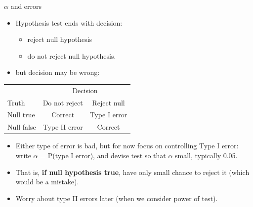 \documentclass[
  ignorenonframetext,
]{beamer}
\providecommand{\tightlist}{%
  \setlength{\itemsep}{0pt}\setlength{\parskip}{0pt}}
\begin{document}
\begin{frame}{\(\alpha\) and errors}
\protect\hypertarget{alpha-and-errors}{}

\begin{itemize}
\tightlist
\item
  Hypothesis test ends with decision:

  \begin{itemize}
  \tightlist
  \item
    reject null hypothesis
  \item
    do not reject null hypothesis.
  \end{itemize}
\item
  but decision may be wrong:
\end{itemize}

\begin{center}
  
  
\begin{tabular}{|l|cc|}
\hline
  & \multicolumn{2}{c|}{Decision}\\
Truth & Do not reject & Reject null\\
\hline
Null true & Correct & Type I error\\
Null false & Type II error & Correct\\
\hline
\end{tabular}
\end{center}

\begin{itemize}
\tightlist
\item
  Either type of error is bad, but for now focus on controlling Type I
  error: write \(\alpha\) = P(type I error), and devise test so that
  \(\alpha\) small, typically 0.05.
\item
  That is, \textbf{if null hypothesis true}, have only small chance to
  reject it (which would be a mistake).
\item
  Worry about type II errors later (when we consider power of test).
\end{itemize}

\end{frame}
\end{document}
